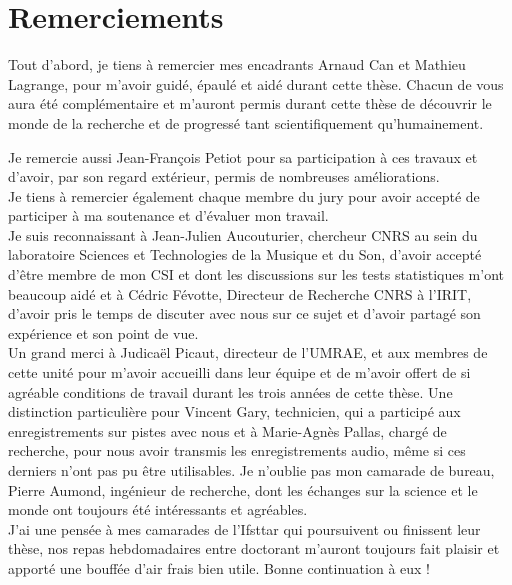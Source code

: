 \chapter*{Remerciements}

Tout d'abord, je tiens à remercier mes encadrants Arnaud Can et Mathieu Lagrange, pour m'avoir guidé, épaulé et aidé durant cette thèse. Chacun de vous aura été complémentaire et m'auront permis durant cette thèse de découvrir le monde de la recherche et de progressé tant scientifiquement qu’humainement.
 
Je remercie aussi Jean-François Petiot pour sa participation à ces travaux et d'avoir, par son regard extérieur, permis de nombreuses améliorations.\\

Je tiens à remercier également chaque membre du jury pour avoir accepté de participer à ma soutenance et d'évaluer mon travail.\\

Je suis reconnaissant à Jean-Julien Aucouturier, chercheur CNRS au sein du laboratoire Sciences et Technologies de la Musique et du Son, d'avoir accepté d'être membre de mon CSI et dont les discussions sur les tests statistiques m'ont beaucoup aidé et à Cédric Févotte, Directeur de Recherche CNRS à l'IRIT, d'avoir pris le temps de discuter avec nous sur ce sujet et d'avoir partagé son expérience et son point de vue.\\

Un grand merci à Judicaël Picaut, directeur de l'UMRAE, et aux membres de cette unité pour m'avoir accueilli dans leur équipe et de m'avoir offert de si agréable conditions de travail durant les trois années de cette thèse. Une distinction particulière pour Vincent Gary, technicien, qui a participé aux enregistrements sur pistes avec nous et à Marie-Agnès Pallas, chargé de recherche, pour nous avoir transmis les enregistrements audio, même si ces derniers n'ont pas pu être utilisables. Je n'oublie pas mon camarade de bureau, Pierre Aumond, ingénieur de recherche, dont les échanges sur la science et le monde ont toujours été intéressants et agréables.\\

J'ai une pensée à mes camarades de l'Ifsttar qui poursuivent ou finissent leur thèse, nos repas hebdomadaires entre doctorant m'auront toujours fait plaisir et apporté une bouffée d'air frais bien utile. Bonne continuation à eux !\\

